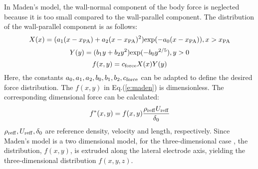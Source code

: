 \documentclass{AIAA}
\begin{document}
In Maden's model, the wall-normal component of the body force is neglected because it is too small compared to the wall-parallel component. The distribution of the wall-parallel component is as follows:
\begin{equation}
    \label{e:madenX}
    X(x)=(a_1(x-x_{\rm PA})+a_2(x-x_{\rm PA})^2){\rm exp}(-a_0(x-x_{\rm PA})),x>x_{\rm PA}
\end{equation}
\begin{equation}
    \label{e:madenY}
    Y(y)=(b_1y+b_2y^2){\rm exp}(-b_0y^{2/5}),y>0
\end{equation}
\begin{equation}
    \label{e:maden}
    f(x,y)=c_{\rm force}X(x)Y(y)
\end{equation}
Here, the constants $a_0,a_1,a_2,b_0,b_1,b_2,c_{\rm force}$ can be adapted to define the desired force distribution. The $f(x,y)$ in Eq.(\ref{e:maden}) is dimensionless. The corresponding dimensional force can be calculated:
\begin{equation}
    f^*(x,y)=f(x,y)\frac{\rho_{\rm reff}U_{\rm reff}}{\delta_{0}}
\end{equation}
$\rho_{\rm reff},U_{\rm reff},\delta_{0}$ are reference density, velocity and length, respectively. Since Maden's model is a two dimensional model, for the three-dimensional case , the distribution, $f(x,y)$, is extruded along the lateral electrode axis, yielding the three-dimensional distribution $f(x,y,z)$.
\end{document}
